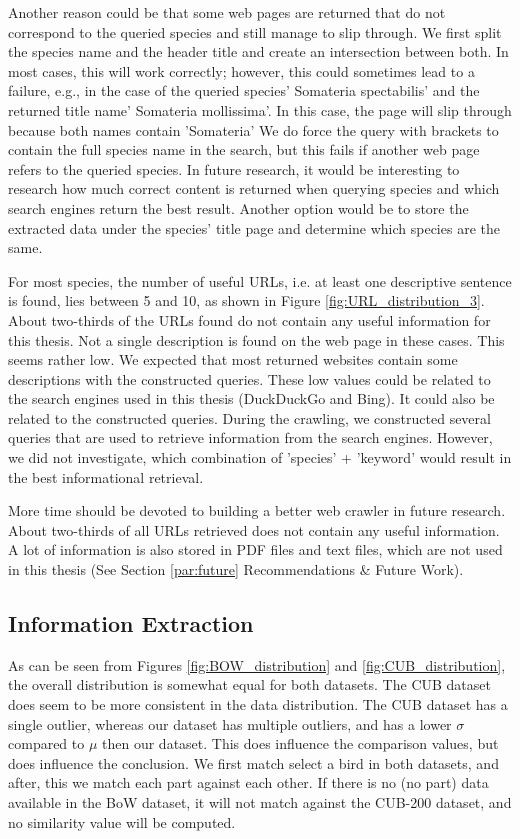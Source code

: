 \documentclass[a4paper, 12pt, oneside]{book} %
\begin{document}
Another reason could be that some web pages are returned that do not correspond to the queried species and still manage to slip through.
We first split the species name and the header title and create an intersection between both.
In most cases, this will work correctly; however, this could sometimes lead to a failure, e.g., in the case of the queried species' Somateria spectabilis' and the returned title name' Somateria mollissima'.
In this case, the page will slip through because both names contain 'Somateria'
We do force the query with brackets to contain the full species name in the search, but this fails if another web page refers to the queried species.
In future research, it would be interesting to research how much correct content is returned when querying species and which search engines return the best result. 
Another option would be to store the extracted data under the species' title page and determine which species are the same. 

For most species, the number of useful URLs, i.e. at least one descriptive sentence is found, lies between 5 and 10, as shown in Figure \ref{fig:URL_distribution_3}.
About two-thirds of the URLs found do not contain any useful information for this thesis.
Not a single description is found on the web page in these cases.
This seems rather low.
We expected that most returned websites contain some descriptions with the constructed queries. 
These low values could be related to the search engines used in this thesis (DuckDuckGo and Bing).
It could also be related to the constructed queries.
During the crawling, we constructed several queries that are used to retrieve information from the search engines.
However, we did not investigate, which combination of 'species' + 'keyword' would result in the best informational retrieval.

More time should be devoted to building a better web crawler in future research. 
About two-thirds of all URLs retrieved does not contain any useful information.
A lot of information is also stored in PDF files and text files, which are not used in this thesis (See Section \ref{par:future} Recommendations \& Future Work).

\subsection{Information Extraction }
As can be seen from Figures \ref{fig:BOW_distribution} and \ref{fig:CUB_distribution}, the overall distribution is somewhat equal for both datasets.
The CUB dataset does seem to be more consistent in the data distribution.
The CUB dataset has a single outlier, whereas our dataset has multiple outliers, and has a lower $\sigma$ compared to $\mu$ then our dataset.
This does influence the comparison values, but does influence the conclusion.
We first match select a bird in both datasets, and after, this we match each part against each other.
If there is no (no part) data available in the BoW dataset, it will not match against the CUB-200 dataset, and no similarity value will be computed.
\end{document}
